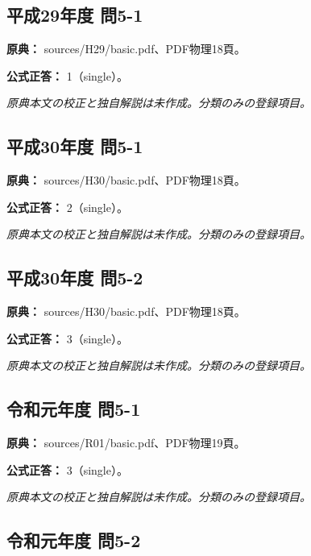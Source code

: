 \subsection{平成29年度 問5-1}
\label{q:h29-reg-basic-5-1}

\noindent\textbf{原典：} sources/H29/basic.pdf、PDF物理18頁。

\textbf{公式正答：} 1（single）。

\par\textit{原典本文の校正と独自解説は未作成。分類のみの登録項目。}

\subsection{平成30年度 問5-1}
\label{q:h30-reg-basic-5-1}

\noindent\textbf{原典：} sources/H30/basic.pdf、PDF物理18頁。

\textbf{公式正答：} 2（single）。

\par\textit{原典本文の校正と独自解説は未作成。分類のみの登録項目。}

\subsection{平成30年度 問5-2}
\label{q:h30-reg-basic-5-2}

\noindent\textbf{原典：} sources/H30/basic.pdf、PDF物理18頁。

\textbf{公式正答：} 3（single）。

\par\textit{原典本文の校正と独自解説は未作成。分類のみの登録項目。}

\subsection{令和元年度 問5-1}
\label{q:r01-reg-basic-5-1}

\noindent\textbf{原典：} sources/R01/basic.pdf、PDF物理19頁。

\textbf{公式正答：} 3（single）。

\par\textit{原典本文の校正と独自解説は未作成。分類のみの登録項目。}

\subsection{令和元年度 問5-2}
\label{q:r01-reg-basic-5-2}

